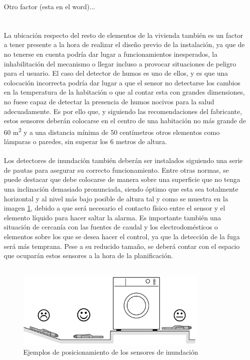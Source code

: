 Otro factor (esta en el word)...\\\\\\
La ubicación respecto del resto de elementos de la vivienda también es un factor a tener presente a la hora de realizar el diseño previo de la instalación, ya que de no tenerse en cuenta podría dar lugar a funcionamientos inesperados, la inhabilitación del mecanismo o llegar incluso a provocar situaciones de peligro para el usuario. El caso del detector de humos es uno de ellos, y es que una colocación incorrecta podría dar lugar a que el sensor no detectarse los cambios en la temperatura de la habitación o que al contar esta con grandes dimensiones, no fuese capaz de detectar la presencia de humos nocivos para la salud adecuadamente. Es por ello que, y siguiendo las recomendaciones del fabricante, estos sensores deberán colocarse en el centro de una habitación no más grande de 60 m\textsuperscript{2} y a una distancia mínima de 50 centímetros  otros elementos como lámparas o paredes, sin superar los 6 metros de altura. \\\\
Los detectores de inundación también deberán ser instalados siguiendo una serie de pautas para asegurar su correcto funcionamiento. Entre otras normas, se puede destacar que debe colocarse de manera sobre una superficie que no tenga una inclinación demasiado pronunciada, siendo óptimo que esta sea totalmente horizontal y al nivel más bajo posible de altura tal y como se muestra en la imagen \ref{fig:local_inundacion}, debido a que será necesario el contacto físico entre el sensor y el elemento líquido para hacer saltar la alarma. Es importante también una situación de cercanía con las fuentes de caudal y los electrodomésticos o elementos sobre los que se desea hacer el control, ya que la detección de la fuga será más temprana. Pese a su reducido tamaño, se deberá contar con el espacio que ocuparán estos sensores a la hora de la planificación.\\\\
\begin{figure}[H]
\begin{center}
\includegraphics[width=0.85\textwidth]{figures/local_inundacion.png}   
\caption{Ejemplos de posicionamiento de los sensores de inundación}
\label{fig:local_inundacion}
\end{center}
\end{figure}
